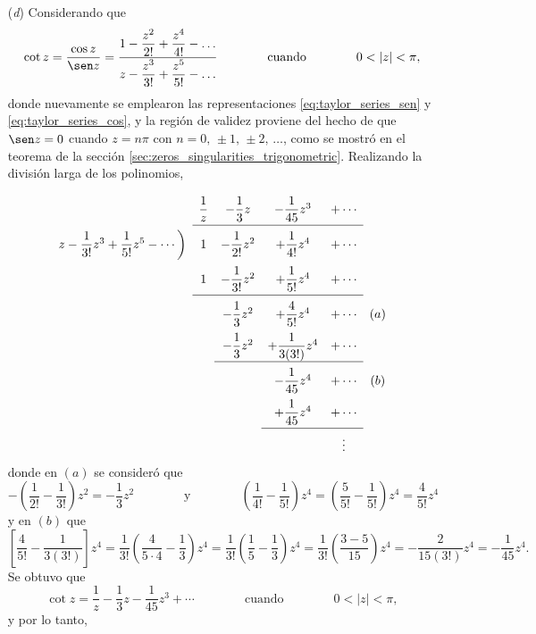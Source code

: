 \documentclass[a4paper]{report}
\begin{document}
\begin{enumerate}
\[ \]
 \item[(\textit{d})] Considerando que 
 \[
  \cot z=\frac{\cos z}{\sen z}=\dfrac{1-\dfrac{z^2}{2!}+\dfrac{z^4}{4!}-\dots}{z-\dfrac{z^3}{3!}+\dfrac{z^5}{5!}-\dots}
  \qquad\qquad\textrm{cuando}\qquad\qquad
   0<|z|<\pi,
 \]
 donde nuevamente se emplearon las representaciones \ref{eq:taylor_series_sen} y \ref{eq:taylor_series_cos}, y la región de validez proviene del hecho de que \(\sen z=0\) cuando \(z=n\pi\) con \(n=0,\,\pm1,\,\pm2,\,\dots\), como se mostró en el teorema de la sección \ref{sec:zeros_singularities_trigonometric}. Realizando la división larga de los polinomios,
\[
\setlength\extrarowheight{10pt}
\begin{array}[t]{cccccc}
                       & \dfrac{1}{z} & -\dfrac{1}{3}z & -\dfrac{1}{45}z^3 & +\cdots&\\[\medskipamount]
\cline{2-5}
z-\dfrac{1}{3!}z^3+
\dfrac{1}{5!}z^5-\cdots 
                \bigg) & 1  & -\dfrac{1}{2!}z^2 & +\dfrac{1}{4!}z^4 & +\cdots &\\
                       & 1  & -\dfrac{1}{3!}z^2 & +\dfrac{1}{5!}z^4 & +\cdots &\\[\medskipamount]
\cline{2-5}
                       &    & -\dfrac{1}{3}z^2 &  +\dfrac{4}{5!}z^4 & +\cdots &(a)\\
                       &    & -\dfrac{1}{3}z^2 &  +\dfrac{1}{3(3!)}z^4 & +\cdots &\\[\medskipamount]
\cline{3-5}
                       &    &                  &  -\dfrac{1}{45}z^4 & +\cdots &(b)\\
                       &    &                  &  +\dfrac{1}{45}z^4 & +\cdots &\\[\medskipamount]
\cline{4-5}
                       &    &                  &   & \vdots&\\
\end{array}
\]
 donde en \((a)\) se consideró que 
 \[
  -\left(\frac{1}{2!}-\frac{1}{3!}\right)z^2=-\frac{1}{3}z^2
  \qquad\qquad\textrm{y}\qquad\qquad
  \left(\frac{1}{4!}-\frac{1}{5!}\right)z^4=\left(\frac{5}{5!}-\frac{1}{5!}\right)z^4=\frac{4}{5!}z^4
 \]
 y en \((b)\) que 
 \[
  \left[\frac{4}{5!}-\frac{1}{3(3!)}\right]z^4=\frac{1}{3!}\left(\frac{4}{5\cdot4}-\frac{1}{3}\right)z^4
  =\frac{1}{3!}\left(\frac{1}{5}-\frac{1}{3}\right)z^4=\frac{1}{3!}\left(\frac{3-5}{15}\right)z^4
  =-\frac{2}{15(3!)}z^4=-\frac{1}{45}z^4.
 \]
 Se obtuvo que 
 \[
  \cot z=\frac{1}{z}-\frac{1}{3}z-\frac{1}{45}z^3+\cdots 
  \qquad\qquad\textrm{cuando}\qquad\qquad
   0<|z|<\pi,
 \]
 y por lo tanto,

\end{enumerate}
\end{document}
